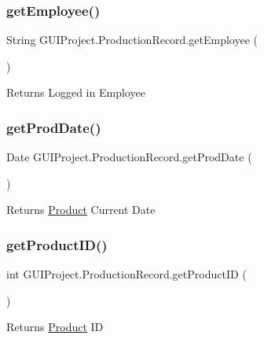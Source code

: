 \subsubsection{\texorpdfstring{getEmployee()}{getEmployee()}}
{\footnotesize\ttfamily String G\+U\+I\+Project.\+Production\+Record.\+get\+Employee (\begin{DoxyParamCaption}{ }\end{DoxyParamCaption})}

\begin{DoxyReturn}{Returns}
Logged in Employee 
\end{DoxyReturn}
\mbox{\label{class_g_u_i_project_1_1_production_record_a223e246e5bd4ff4db0f2314040fb0274}} 
\subsubsection{\texorpdfstring{getProdDate()}{getProdDate()}}
{\footnotesize\ttfamily Date G\+U\+I\+Project.\+Production\+Record.\+get\+Prod\+Date (\begin{DoxyParamCaption}{ }\end{DoxyParamCaption})}

\begin{DoxyReturn}{Returns}
\mbox{\hyperlink{class_g_u_i_project_1_1_product}{Product}} Current Date 
\end{DoxyReturn}
\mbox{\label{class_g_u_i_project_1_1_production_record_af9913b5112761715b5b99c2d1153a8ef}} 
\subsubsection{\texorpdfstring{getProductID()}{getProductID()}}
{\footnotesize\ttfamily int G\+U\+I\+Project.\+Production\+Record.\+get\+Product\+ID (\begin{DoxyParamCaption}{ }\end{DoxyParamCaption})}

\begin{DoxyReturn}{Returns}
\mbox{\hyperlink{class_g_u_i_project_1_1_product}{Product}} ID 
\end{DoxyReturn}
\mbox{\label{class_g_u_i_project_1_1_production_record_a4e54a362ea073dc384d4c0f7746c6ad4}} 
